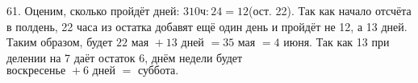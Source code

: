 61. Оценим, сколько пройдёт дней: $310\text{ч}:24=12$(ост. 22). Так как начало отсчёта в полдень, 22 часа из остатка добавят ещё один день и пройдёт не 12, а 13 дней. Таким образом, будет $22\text{ мая }+13\text{ дней }=35\text{ мая }=4\text{ июня}.$ Так как 13 при делении на 7 даёт остаток 6, днём недели будет $\text{воскресенье }+6\text{ дней }=\text{ суббота.}$\\
